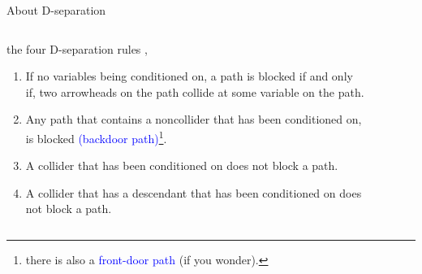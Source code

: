 \begin{frame}
	{About D-separation}
	\begin{columns}
		\begin{column}{0.5\textwidth}
			the four D-separation rules \cite{Hernan_2020},
			\begin{enumerate}
				\item If no variables being conditioned on, a path is blocked if and only if, two arrowheads on the path collide at some variable on the path.
				\item Any path that contains a noncollider that has been conditioned on, is blocked \textcolor{blue}{(backdoor path)}\footnote{there is also a \textcolor{blue}{front-door path} (if you wonder).}.
				\item A collider that has been conditioned on does not block a path.
				\item A collider that has a descendant that has been conditioned on does not block a path.
			\end{enumerate}
		\end{column}
		\begin{column}{0.5\textwidth}  
			\begin{figure}
			\end{figure}
			\begin{figure}
			\end{figure}
			\begin{figure}
\end{figure}
\end{column}
\end{columns}
\end{frame}
